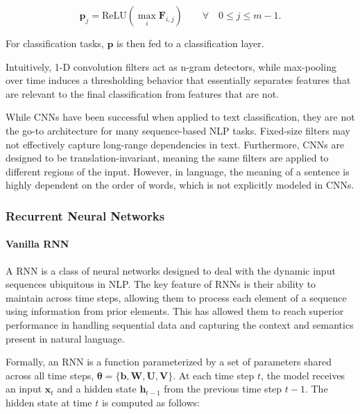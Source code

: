 \begin{equation}
    \bm{p}_j = \mathrm{ReLU}(\max_{i}\bm{F}_{i,j}) \qquad \forall \quad 0 \leq j \leq m-1.
\end{equation}

For classification tasks, $\bm{p}$ is then fed to a classification layer.

Intuitively, 1-D convolution filters act as n-gram detectors, while max-pooling over time induces a thresholding behavior that essentially separates features that are relevant to the final classification from features that are not.

While \acp{CNN} have been successful when applied to text classification, they are not the go-to architecture for many sequence-based \ac{NLP} tasks. Fixed-size filters may not effectively capture long-range dependencies in text. Furthermore, \acp{CNN} are designed to be translation-invariant, meaning the same filters are applied to different regions of the input. However, in language, the meaning of a sentence is highly dependent on the order of words, which is not explicitly modeled in \acp{CNN}. 



\subsubsection{Recurrent Neural Networks}

\paragraph{Vanilla \ac{RNN}} A \ac{RNN} is a class of neural networks designed to deal with the dynamic input sequences ubiquitous in \ac{NLP}. The key feature of \acp{RNN} is their ability to maintain  across time steps, allowing them to process each element of a sequence using information from prior elements. This has allowed them to reach superior performance in handling sequential data and capturing the context and semantics present in natural language.  

Formally, an \ac{RNN} is a function parameterized by a set of parameters shared across all time steps, $\bm{\theta} = \{\bm{b}, \bm{W}, \bm{U}, \bm{V}\}$. At each time step $t$, the model receives an input $\bm{x}_t$ and a hidden state $\bm{h}_{t-1}$ from the previous time step $t-1$. The hidden state at time $t$ is computed as follows:

